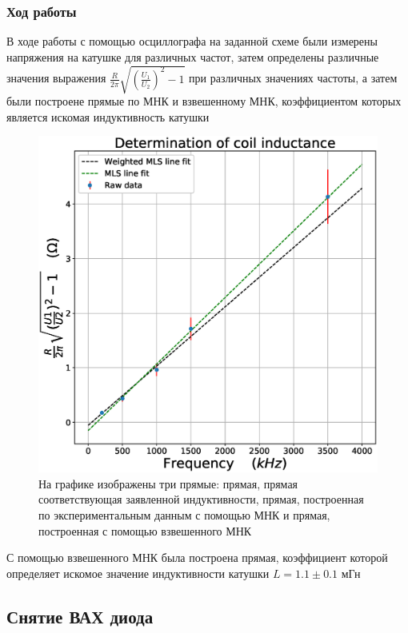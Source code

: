 \documentclass[a4paper,14pt]{extarticle}
\begin{document}
			\subsubsection{Ход работы}
				В ходе работы с помощью осциллографа на заданной схеме были измерены напряжения на катушке для различных частот, затем определены различные значения выражения $\frac{R}{2\pi}\sqrt{(\frac{U_1}{U_2})^2 - 1}$ при различных значениях частоты, а затем были построене прямые по МНК и взвешенному МНК, коэффициентом которых является искомая индуктивность катушки
				\begin{figure}[h]
					\centering
					\includegraphics[width=.80\linewidth]{Lab1_1.eps}
					\caption{На графике изображены три прямые: прямая, прямая соответствующая заявленной индуктивности, прямая, построенная по экспериментальным данным с помощью МНК и прямая, построенная с помощью взвешенного МНК}
					\label{fig2}
				\end{figure} 
				\newpage
				С помощью взвешенного МНК была построена прямая, коэффициент которой определяет искомое значение индуктивности катушки \newline $L = 1.1 \pm 0.1 $ мГн
		\subsection{Снятие ВАХ диода}
\end{document}
